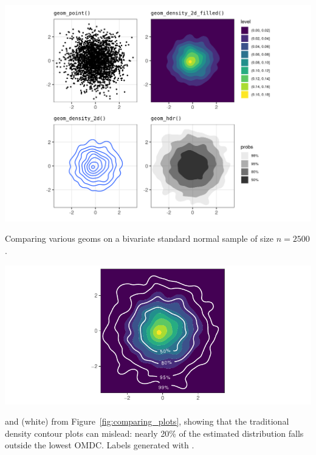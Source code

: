 \begin{knitrout}
\color{fgcolor}\begin{widefigure}[h!]

{\centering \includegraphics[width=\maxwidth]{figures/comparing_plots-1}

}

\caption{Comparing various geoms on a bivariate standard normal sample of size $n = 2500$.}\label{fig:comparing_plots}
\end{widefigure}

\end{knitrout}



\begin{knitrout}
\color{fgcolor}\begin{widefigure}[h!]

{\centering \includegraphics[width=\maxwidth]{figures/comparing_plots-2-1}

}

\caption{ and  (white) from Figure~\ref{fig:comparing_plots}, showing that the traditional density contour plots can mislead: nearly 20\% of the estimated distribution falls outside the lowest OMDC. Labels generated with  \citep{geomtextpath}.}\label{fig:comparing_plots-2}
\end{widefigure}

\end{knitrout}



